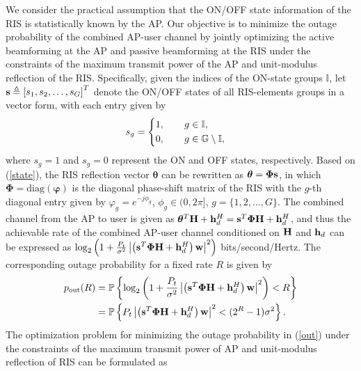 \documentclass[draftclsnofoot,onecolumn,12pt]{IEEEtran}
\begin{document}
We consider the practical assumption that the ON/OFF state information of the RIS is statistically known by the AP. 
	Our objective is to minimize the  outage probability of the combined AP-user channel
	by jointly optimizing the active beamforming at the AP and passive beamforming at the RIS under the constraints of the maximum transmit power  of the AP and unit-modulus reflection of the RIS.  
Specifically, given the indices of the ON-state groups ${\mathbb I}$, let ${\bf s}\triangleq \left[{ s}_1, { s}_2,\ldots ,{ s}_G \right]^T$ denote the ON/OFF states of all  RIS-elements groups in a vector form, with each entry given by
\begin{align}\label{state}
{s}_g=\left\{ \begin{gathered}
1,\quad\quad g \in {\mathbb I}, \hfill \\
0,\quad\quad g \in \mathbb{G}\setminus \mathbb{I}, \hfill
\end{gathered}  \right. \quad 
\end{align}
where ${s}_g=1$ and ${s}_g=0$ represent the ON and OFF states, respectively. 
Based on (\ref{state}), the RIS reflection vector ${\bm \theta}$ can be rewritten as ${\bm \theta}={\bm \Phi}{\bf s}$, in which ${\bm \Phi}=\text{diag}\left({\bm \varphi} \right)$ is the diagonal phase-shift matrix of
the RIS with the $g$-th diagonal entry given by $\varphi_g= e^{-j\phi_g}$, $\phi_g\in(0, 2\pi]$, $g=\{1,2,\ldots,G\}$. 
The combined channel from the AP to user is given as ${\bm \theta}^T{\bf H}+ {\bf h}_d^H={\bf s}^T {\bm \Phi} {{\bf H}} + {{\bf h}}_d^H$, and thus the
	achievable rate of the combined AP-user channel conditioned on ${{\bf H}}$ and ${{\bf h}}_d$ can be expressed as
	$
	\log_2 \left( 1+ \frac{P_t}{\sigma^2}
	\left|\left({\bf s}^T {\bm \Phi} {{\bf H}} + {{\bf h}}_d^H\right) {\bf w}\right|^2 \right) 
	$ bits/second/Hertz.
	The corresponding outage probability for a fixed rate $R$ is given by
	\begin{align}\notag
	p_\text{out} (R) &=\mathbb{P} \left\{ \log_2 \left( 1+ \frac{P_t}{\sigma^2}
	\left|\left({\bf s}^T {\bm \Phi} {{\bf H}} + {{\bf h}}_d^H\right) {\bf w}\right|^2 \right) < R \right\}\\\label{out}
	& = \mathbb{P} \left\{ {P_t}
	\left|\left({\bf s}^T {\bm \Phi} {{\bf H}} + {{\bf h}}_d^H\right) {\bf w}\right|^2 < (2^R -1){\sigma^2}\right\}.
	\end{align}
	The optimization problem for minimizing the  outage probability in (\ref{out}) under the constraints of the maximum transmit power of AP and unit-modulus reflection of RIS can be formulated as 
\end{document}
